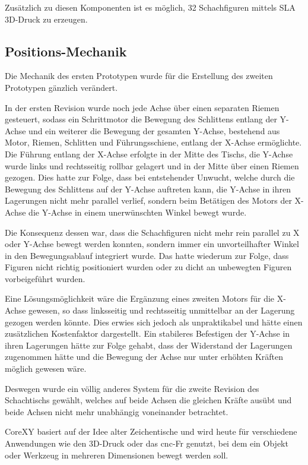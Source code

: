 Zusätzlich zu diesen Komponenten ist es möglich, 32 Schachfiguren
mittels SLA 3D-Druck zu erzeugen.

\hypertarget{positions-mechanik}{%
\subsection{Positions-Mechanik}\label{positions-mechanik}}

Die Mechanik des ersten Prototypen wurde für die Erstellung des zweiten
Prototypen gänzlich verändert.

In der ersten Revision wurde noch jede Achse über einen separaten Riemen
gesteuert, sodass ein Schrittmotor die Bewegung des Schlittens entlang
der Y-Achse und ein weiterer die Bewegung der gesamten Y-Achse,
bestehend aus Motor, Riemen, Schlitten und Führungsschiene, entlang der
X-Achse ermöglichte. Die Führung entlang der X-Achse erfolgte in der
Mitte des Tischs, die Y-Achse wurde links und rechtsseitig rollbar
gelagert und in der Mitte über einen Riemen gezogen. Dies hatte zur
Folge, dass bei entstehender Unwucht, welche durch die Bewegung des
Schlittens auf der Y-Achse auftreten kann, die Y-Achse in ihren
Lagerungen nicht mehr parallel verlief, sondern beim Betätigen des
Motors der X-Achse die Y-Achse in einem unerwünschten Winkel bewegt
wurde.

Die Konsequenz dessen war, dass die Schachfiguren nicht mehr rein
parallel zu X oder Y-Achse bewegt werden konnten, sondern immer ein
unvorteilhafter Winkel in den Bewegungsablauf integriert wurde. Das
hatte wiederum zur Folge, dass Figuren nicht richtig positioniert wurden
oder zu dicht an unbewegten Figuren vorbeigeführt wurden.

Eine Lösungsmöglichkeit wäre die Ergänzung eines zweiten Motors für die
X-Achse gewesen, so dass linksseitig und rechtsseitig unmittelbar an der
Lagerung gezogen werden könnte. Dies erwies sich jedoch als
unpraktikabel und hätte einen zusätzlichen Kostenfaktor dargestellt. Ein
stabileres Befestigen der Y-Achse in ihren Lagerungen hätte zur Folge
gehabt, dass der Widerstand der Lagerungen zugenommen hätte und die
Bewegung der Achse nur unter erhöhten Kräften möglich gewesen wäre.

Deswegen wurde ein völlig anderes System für die zweite Revision des
Schachtischs gewählt, welches auf beide Achsen die gleichen Kräfte
ausübt und beide Achsen nicht mehr unabhängig voneinander betrachtet.

CoreXY basiert auf der Idee alter Zeichentische und wird heute für
verschiedene Anwendungen wie den 3D-Druck oder das \gls{cnc}-Fr genutzt,
bei dem ein Objekt oder Werkzeug in mehreren Dimensionen bewegt werden
soll.


